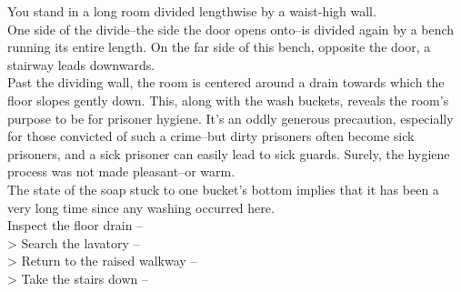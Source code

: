 You stand in a long room divided lengthwise by a waist-high wall.\\

One side of the divide--the side the door opens onto--is divided again by a bench running its entire length. On the far side of this bench, opposite the door, a stairway leads downwards.\\

Past the dividing wall, the room is centered around a drain towards which the floor slopes gently down. This, along with the wash buckets, reveals the room’s purpose to be for prisoner hygiene. It’s an oddly generous precaution, especially for those convicted of such a crime--but dirty prisoners often become sick prisoners, and a sick prisoner can easily lead to sick guards. Surely, the hygiene process was not made pleasant--or warm.\\

The state of the soap stuck to one bucket’s bottom implies that it has been a very long time since any washing occurred here.\\

 Inspect the floor drain -- \\
> Search the lavatory -- \\
> Return to the raised walkway -- \\
> Take the stairs down -- 